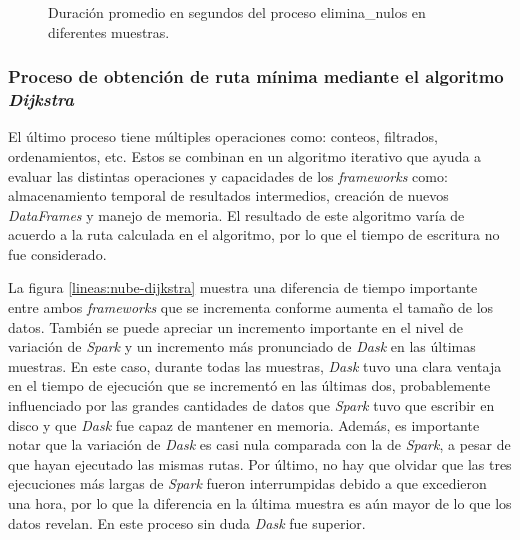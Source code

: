 \begin{figure}
\centering
{}
\caption{Duración promedio en segundos del proceso elimina\_nulos en diferentes muestras.}
\label{lineas:nube-elimina-nulos}
\end{figure}

\subsubsection{Proceso de obtención de ruta mínima mediante el algoritmo \textit{Dijkstra}}

El último proceso tiene múltiples operaciones como: conteos, filtrados, ordenamientos, etc. Estos se combinan en un algoritmo iterativo que ayuda a evaluar las distintas operaciones y capacidades de los \textit{frameworks} como: almacenamiento temporal de resultados intermedios, creación de nuevos \textit{DataFrames} y manejo de memoria. El resultado de este algoritmo varía de acuerdo a la ruta calculada en el algoritmo, por lo que el tiempo de escritura no fue considerado.

La figura \ref{lineas:nube-dijkstra} muestra una diferencia de tiempo importante entre ambos \textit{frameworks} que se incrementa conforme aumenta el tamaño de los datos. También se puede apreciar un incremento importante en el nivel de variación de \textit{Spark} y un incremento más pronunciado de \textit{Dask} en las últimas muestras. En este caso, durante todas las muestras, \textit{Dask} tuvo una clara ventaja en el tiempo de ejecución que se incrementó en las últimas dos, probablemente influenciado por las grandes cantidades de datos que \textit{Spark} tuvo que escribir en disco y que \textit{Dask} fue capaz de mantener en memoria. Además, es importante notar que la variación de \textit{Dask} es casi nula comparada con la de \textit{Spark}, a pesar de que hayan ejecutado las mismas rutas. Por último, no hay que olvidar que las tres ejecuciones más largas de \textit{Spark} fueron interrumpidas debido a que excedieron una hora, por lo que la diferencia en la última muestra es aún mayor de lo que los datos revelan. En este proceso sin duda \textit{Dask} fue superior.


